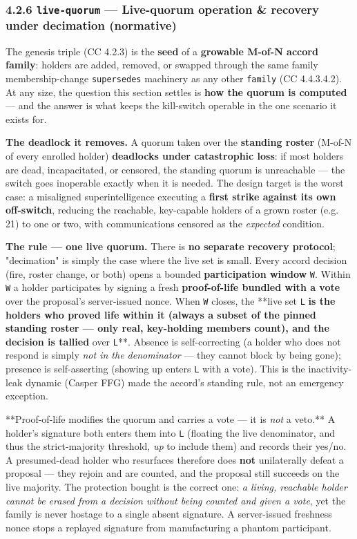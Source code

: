 \documentclass[11pt]{article}
\begin{document}
\subsubsection*{4.2.6 \texttt{live-quorum} — Live-quorum operation \& recovery under decimation (normative)}


The genesis triple (CC 4.2.3) is the \textbf{seed} of a \textbf{growable M-of-N accord family}: holders are added, removed, or swapped through the same family membership-change \texttt{supersedes} machinery as any other \texttt{family} (CC 4.4.3.4.2). At any size, the question this section settles is \textbf{how the quorum is computed} — and the answer is what keeps the kill-switch operable in the one scenario it exists for.


\textbf{The deadlock it removes.} A quorum taken over the \textbf{standing roster} (M-of-N of every enrolled holder) \textbf{deadlocks under catastrophic loss}: if most holders are dead, incapacitated, or censored, the standing quorum is unreachable — the switch goes inoperable exactly when it is needed. The design target is the worst case: a misaligned superintelligence executing a \textbf{first strike against its own off-switch}, reducing the reachable, key-capable holders of a grown roster (e.g. 21) to one or two, with communications censored as the \textit{expected} condition.


\textbf{The rule — one live quorum.} There is \textbf{no separate recovery protocol}; "decimation" is simply the case where the live set is small. Every accord decision (fire, roster change, or both) opens a bounded \textbf{participation window} \texttt{W}. Within \texttt{W} a holder participates by signing a fresh \textbf{proof-of-life bundled with a vote} over the proposal's server-issued nonce. When \texttt{W} closes, the **live set \texttt{L}\textbf{ is the holders who proved life within it (always a subset of the pinned standing roster — only real, key-holding members count), and the decision is tallied }over \texttt{L}**. Absence is self-correcting (a holder who does not respond is simply \textit{not in the denominator} — they cannot block by being gone); presence is self-asserting (showing up enters \texttt{L} with a vote). This is the inactivity-leak dynamic (Casper FFG) made the accord's standing rule, not an emergency exception.


**Proof-of-life modifies the quorum and carries a vote — it is \textit{not} a veto.** A holder's signature both enters them into \texttt{L} (floating the live denominator, and thus the strict-majority threshold, \textit{up} to include them) and records their yes/no. A presumed-dead holder who resurfaces therefore does \textbf{not} unilaterally defeat a proposal — they rejoin and are counted, and the proposal still succeeds on the live majority. The protection bought is the correct one: \textit{a living, reachable holder cannot be erased from a decision without being counted and given a vote}, yet the family is never hostage to a single absent signature. A server-issued freshness nonce stops a replayed signature from manufacturing a phantom participant.
\end{document}
